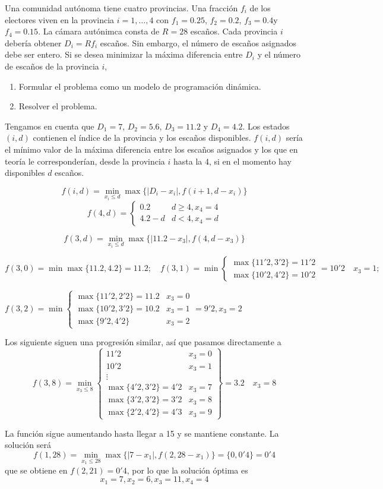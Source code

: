 \documentclass[twoside]{article}
\begin{document}
\begin{ejercicio}{10}
Una comunidad autónoma tiene cuatro provincias. Una fracción $f_i$ de los electores viven en
la provincia $i = 1,\dots,4$ con $f_1 = 0.25$, $f_2 = 0.2$, $f_3 = 0.4 $y $f_4 = 0.15$. La cámara autónimca consta
de $R = 28$ escaños. Cada provincia $i$ debería obtener $D_i = Rf_i$ escaños. Sin embargo, el número
de escaños asignados debe ser entero. Si se desea minimizar la máxima diferencia entre $D_i$ y el
número de escaños de la provincia $i$,
\begin{enumerate}
\item Formular el problema como un modelo de programación dinámica.
\item Resolver el problema.
\end{enumerate}
\end{ejercicio}
\begin{solucion}
Tengamos en cuenta que $D_1=7$, $D_2=5.6$, $D_3=11.2$ y $D_4=4.2$. Los estados $(i,d)$ contienen el índice de la provincia y los escaños disponibles.
$f(i,d)$ sería el mínimo valor de la máxima diferencia entre los escaños asignados y los que en teoría le corresponderían, desde la provincia $i$ hasta la 4, si en el momento hay disponibles $d$ escaños. 

$$f(i,d)=\min_{x_i\leq d}\max\{|D_i-x_i|,f(i+1,d-x_i)\}$$
$$f(4,d)=\begin{cases}
0.2 & d\geq 4,x_4=4\\
4.2-d & d<4, x_4=d
\end{cases}$$

$$f(3,d)=\min_{x_i\leq d}\max\{|11.2-x_3|,f(4,d-x_3)\}$$

$f(3,0)=\min\max\{11.2,4.2\}=11.2;\quad f(3,1)=\min\begin{cases}
\max\{11'2,3'2\}=11'2\\
\max\{10'2,4'2\}=10'2
\end{cases}=10'2\quad x_3=1;$

$f(3,2)=\min\begin{cases}
\max\{11'2,2'2\}=11.2 & x_3=0\\
\max\{10'2,3'2\}=10.2 & x_3=1\\
\max\{9'2,4'2\} & x_3=2
\end{cases}=9'2, x_3=2$

Los siguiente siguen una progresión similar, así que pasamos directamente a 
$$f(3,8)=\min_{x_3\leq 8}\left.\begin{cases}
11'2 & x_3=0\\
10'2 & x_3=1\\
\vdots & \\
\max\{4'2,3'2\}=4'2 & x_3=7\\
\max\{3'2,3'2\}=3'2 & x_3=8\\
\max\{2'2,4'2\}=4'3 & x_3=9
\end{cases}\right\}= 3.2\quad x_3=8$$

La función sigue aumentando hasta llegar a 15 y se mantiene constante. La solución será 
$$f(1,28)=\min_{x_1\leq 28}\max\{|7-x_1|,f(2,28-x_1)\}=\{0,0'4\}=0'4$$
que se obtiene en $f(2,21)=0'4$, por lo que la solución óptima es 
$$\boxed{x_1=7, x_2=6,x_3=11,x_4=4}$$

\end{solucion}
\end{document}
